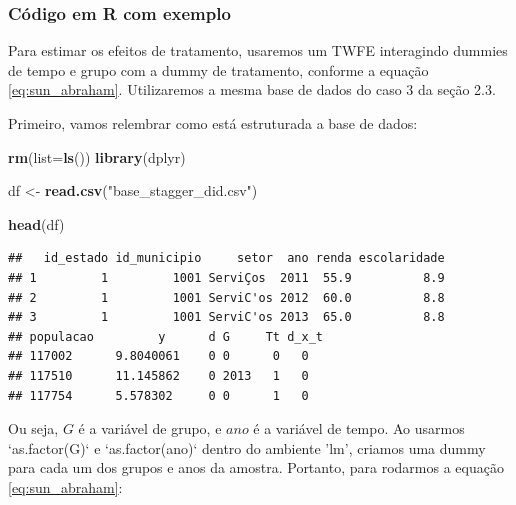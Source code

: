 \documentclass[portugues]{article}
\newenvironment{Shaded}{\begin{snugshade}}{\end{snugshade}}
\newcommand{\AttributeTok}[1]{\textcolor[rgb]{0.13,0.29,0.53}{#1}}
\newcommand{\FunctionTok}[1]{\textcolor[rgb]{0.13,0.29,0.53}{\textbf{#1}}}
\newcommand{\NormalTok}[1]{#1}
\newcommand{\OtherTok}[1]{\textcolor[rgb]{0.56,0.35,0.01}{#1}}
\newcommand{\StringTok}[1]{\textcolor[rgb]{0.31,0.60,0.02}{#1}}
\begin{document}
\subsubsection{Código em R com exemplo}

Para estimar os efeitos de tratamento, usaremos um TWFE interagindo dummies de tempo e grupo com a dummy de tratamento, conforme a equação \eqref{eq:sun_abraham}. Utilizaremos a mesma base de dados do caso 3 da seção 2.3.

Primeiro, vamos relembrar como está estruturada a base de dados:

\begin{box_code}

\begin{Shaded}
\begin{Highlighting}[]
\FunctionTok{rm}\NormalTok{(}\AttributeTok{list=}\FunctionTok{ls}\NormalTok{())}
\FunctionTok{library}\NormalTok{(dplyr)}

\NormalTok{df }\OtherTok{\textless{}{-}} \FunctionTok{read.csv}\NormalTok{(}\StringTok{"base\_stagger\_did.csv"}\NormalTok{)}

\FunctionTok{head}\NormalTok{(df)}
\end{Highlighting}
\end{Shaded}

\begin{verbatim}
##   id_estado id_municipio     setor  ano renda escolaridade 
## 1         1         1001 ServiÇos  2011  55.9          8.9    
## 2         1         1001 ServiC'os 2012  60.0          8.8    
## 3         1         1001 ServiC'os 2013  65.0          8.8    
## populacao         y      d G     Tt d_x_t
## 117002      9.8040061    0 0      0   0
## 117510      11.145862    0 2013   1   0
## 117754      5.578302     0 0      1   0
\end{verbatim}

\end{box_code}

Ou seja, $G$ é a variável de grupo, e $ano$ é a variável de tempo. Ao usarmos `as.factor(G)` e `as.factor(ano)` dentro do ambiente 'lm', criamos uma dummy para cada um dos grupos e anos da amostra. Portanto, para rodarmos a equação \eqref{eq:sun_abraham}:
\end{document}
